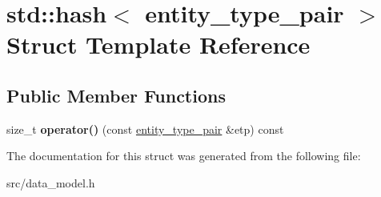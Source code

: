 \hypertarget{structstd_1_1hash_3_01entity__type__pair_01_4}{}\section{std\+:\+:hash$<$ entity\+\_\+type\+\_\+pair $>$ Struct Template Reference}
\label{structstd_1_1hash_3_01entity__type__pair_01_4}
\subsection*{Public Member Functions}
\begin{DoxyCompactItemize}
\item 
\mbox{\label{structstd_1_1hash_3_01entity__type__pair_01_4_a467a9a5eb3a746a32ec3c3751c24c57e}} 
size\+\_\+t {\bfseries operator()} (const \hyperlink{structentity__type__pair}{entity\+\_\+type\+\_\+pair} \&etp) const
\end{DoxyCompactItemize}


The documentation for this struct was generated from the following file\+:\begin{DoxyCompactItemize}
\item 
src/data\+\_\+model.\+h\end{DoxyCompactItemize}
